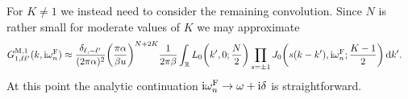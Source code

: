 \documentclass[english, parskip=full]{scrartcl}
\begin{document}
For $K\neq 1$ we instead need to consider the remaining convolution.
Since $N$ is rather small for moderate values of $K$ we may approximate
\begin{align}
G_{1,\ell\ell'}^{\M,1}(k,\i\omega_n^\F) &\approx \frac{\delta_{\ell,-\ell'}}{(2\pi\alpha)^2} \kla*{\frac{\pi\alpha}{\beta u}}^{N+2K} \frac{1}{2\pi\beta} \intr{L_0\kla*{k',0; \frac{N}{2}} \prod_{s = \pm 1} J_0\kla*{s(k-k'),\i\omega_{n}^\F; \frac{K-1}{2}} }{k'}.
\end{align}
At this point the analytic continuation $\text{i}\omega_n^{\text{F}} \rightarrow \omega + \text{i}\delta$ is straightforward.
\end{document}
